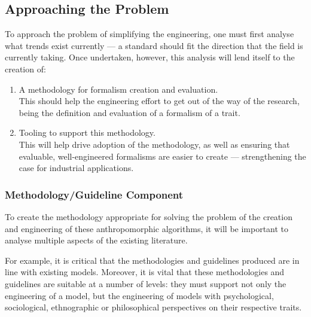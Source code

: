 \subsection*{Approaching the Problem}\label{sec:approaching_the_problem}

To approach the problem of simplifying the engineering, one must first analyse what trends exist currently --- a standard should fit the direction that the field is currently taking. Once undertaken, however, this analysis will lend itself to the creation of:
\begin{enumerate}
    \item A methodology for formalism creation and evaluation.\\
    This should help the engineering effort to get out of the way of the research, being the definition and evaluation of a formalism of a trait.
    \item Tooling to support this methodology.\\
    This will help drive adoption of the methodology, as well as ensuring that evaluable, well-engineered formalisms are easier to create --- strengthening the case for industrial applications.
\end{enumerate}

\subsubsection*{Methodology/Guideline Component}\label{sec:methodology}
To create the methodology appropriate for solving the problem of the creation and engineering of these anthropomorphic algorithms, it will be important to analyse multiple aspects of the existing literature.\par

For example, it is critical that the methodologies and guidelines produced are in line with existing models. Moreover, it is vital that these methodologies and guidelines are suitable at a number of levels: they must support not only the engineering of a model, but the engineering of models with psychological, sociological, ethnographic or philosophical perspectives on their respective traits.\par

